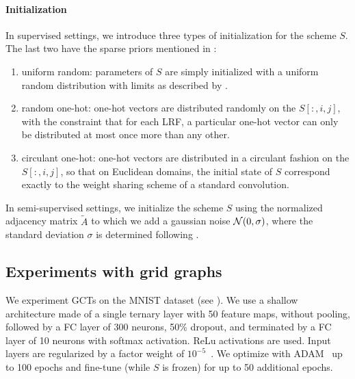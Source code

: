 \paragraph{Initialization}
In supervised settings, we introduce three types of initialization for the scheme $S$. The last two have the sparse priors mentioned in :
\begin{enumerate}
  \item uniform random: parameters of $S$ are simply initialized with a uniform random distribution with limits as described by \cite{glorot2010understanding}.
  \item random one-hot: one-hot vectors are distributed randomly on the $S[:,i,j]$, with the constraint that for each LRF, a particular one-hot vector can only be distributed at most once more than any other.
  \item circulant one-hot: one-hot vectors are distributed in a circulant fashion on the $S[:,i,j]$, so that on Euclidean domains, the initial state of $S$ correspond exactly to the weight sharing scheme of a standard convolution.
\end{enumerate}

In semi-supervised settings, we initialize the scheme $S$ using the normalized adjacency matrix $\widetilde{A}$ to which we add a gaussian noise $\mathcal{N}(0,\sigma)$, where the standard deviation $\sigma$ is determined following \cite{glorot2010understanding}.

\subsection{Experiments with grid graphs}

We experiment GCTs on the MNIST dataset (see ). We use a shallow architecture made of a single ternary layer with 50 feature maps, without pooling, followed by a FC layer of 300 neurons, 50\% dropout, and terminated by a FC layer of 10 neurons with softmax activation. ReLu activations are used. Input layers are regularized by a factor weight of $10^{-5}$~\citep{ng2004feature}. We optimize with ADAM~\citep{kingma2014adam} up to 100 epochs and fine-tune (while $S$ is frozen) for up to 50 additional epochs.

